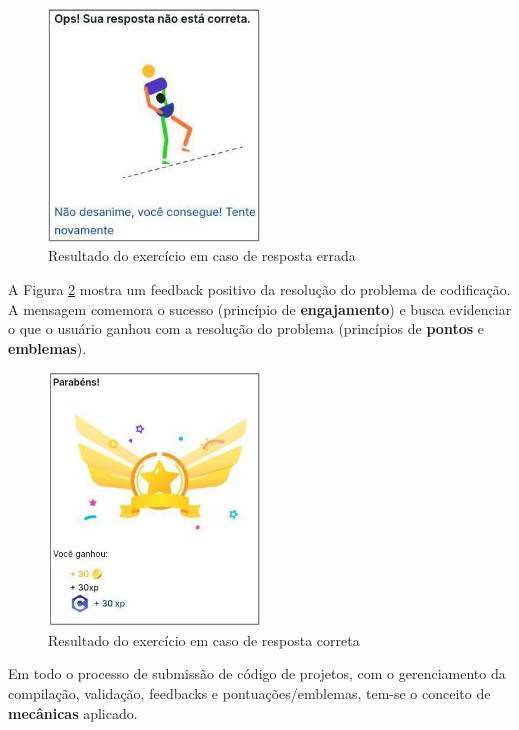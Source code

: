\documentclass[12pt]{article}
\begin{document}
\begin{figure}[ht!]
\centering
\includegraphics[width=0.5\textwidth]{imagens/feedback_resposta_incorreta.jpg}
\caption{Resultado do exercício em caso de resposta errada}
\label{fig:feedback_incorreta}
\end{figure}

A Figura \ref{fig:feedback_correta} mostra um feedback positivo da resolução do problema de codificação. A mensagem comemora o sucesso (princípio de \textbf{engajamento}) e busca evidenciar o que o usuário ganhou com a resolução do problema (princípios de \textbf{pontos} e \textbf{emblemas}). 

\begin{figure}[ht!]
\centering
\includegraphics[width=0.5\textwidth]{imagens/feedback_resposta_correta.jpg}
\caption{Resultado do exercício em caso de resposta correta}
\label{fig:feedback_correta}
\end{figure}

Em todo o processo de submissão de código de projetos, com o gerenciamento da compilação, validação, feedbacks e pontuações/emblemas, tem-se o conceito de \textbf{mecânicas} aplicado. 
\end{document}
